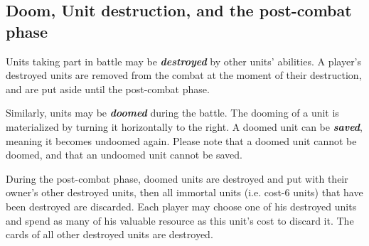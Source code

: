 \documentclass[a4paper]{article}
\begin{document}
  \subsection{Doom, Unit destruction, and the post-combat phase}
  
    Units taking part in battle may be \textbf{\textit{destroyed}} by other units' abilities.
    A player's destroyed units are removed from the combat at the moment of their destruction,
    and are put aside until the post-combat phase.
    
    Similarly, units may be \textbf{\textit{doomed}} during the battle.
    The dooming of a unit is materialized by turning it horizontally to the right.
    A doomed unit can be \textbf{\textit{saved}}, meaning it becomes undoomed again.
    Please note that a doomed unit cannot be doomed, and that an undoomed unit cannot be saved.
    
    During the post-combat phase, doomed units are destroyed and put with their owner's other
    destroyed units, then all immortal units (i.e. cost-6 units) that have been destroyed are
    discarded.
    Each player may choose one of his destroyed units and spend as many of his valuable resource as
    this unit's cost to discard it.
    The cards of all other destroyed units are destroyed.
    
    
    
\end{document}
